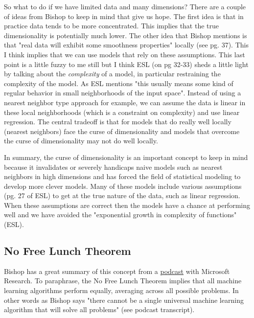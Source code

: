 So what to do if we have limited data and many dimensions? There are a couple of ideas from Bishop to keep in mind that give us hope. The first idea is that in practice data tends to be more concentrated. This implies that the true dimensionality is potentially much lower. The other idea that Bishop mentions is that "real data will exhibit some smoothness properties" locally (see pg. 37). This I think implies that we can use models that rely on these assumptions. This last point is a little fuzzy to me still but I think ESL (on pg 32-33) sheds a little light by talking about the \emph{complexity} of a model, in particular restraining the complexity of the model. As ESL mentions "this usually means some kind of regular behavior in small neighborhoods of the input space". Instead of using a nearest neighbor type approach for example, we can assume the data is linear in these local neighborhoods (which is a constraint on complexity) and use linear regression. The central tradeoff is that for models that do really well locally (nearest neighbors) face the curse of dimensionality and models that overcome the curse of dimensionality may not do well locally.

In summary, the curse of dimensionality is an important concept to keep in mind because it invalidates or severely handicaps naive models such as nearest neighbors in high dimensions and has forced the field of statistical modeling to develop more clever models. Many of these models include various assumptions (pg. 27 of ESL) to get at the true nature of the data, such as linear regression. When these assumptions are correct then the models have a chance at performing well and we have avoided the "exponential growth in complexity of functions" (ESL).


\subsection{No Free Lunch Theorem}

Bishop has a great summary of this concept from a \href{https://www.microsoft.com/en-us/research/blog/machine-learning-and-the-learning-machine-with-dr-christopher-bishop/}{podcast} with Microsoft Research. To paraphrase, the No Free Lunch Theorem implies that all machine learning algorithms perform equally, averaging across all possible problems. In other words as Bishop says "there cannot be a single universal machine learning algorithm that will solve all problems" (see podcast transcript). 

